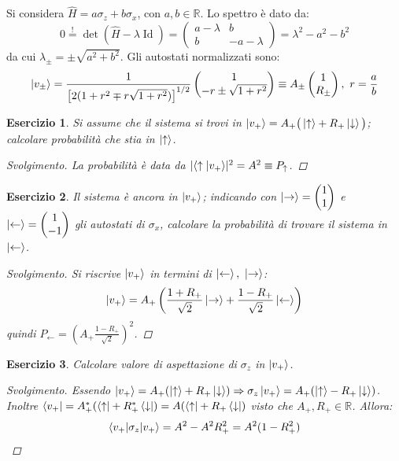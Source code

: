 \documentclass[10pt, a4paper]{scrartcl}
\numberwithin{equation}{subsection}
\theoremstyle{style2}
\theoremstyle{style1}
\newtheorem{esercizio}{Esercizio}[section]
\renewcommand\qedsymbol{$\blacksquare$}
\newenvironment{svolgimento}{\renewcommand\qedsymbol{$\spadesuit$}\begin{proof}[Svolgimento]}{\end{proof}}
\begin{document}
	Si considera $\hat{H} = a \sigma _z + b \sigma _x$, con $a,b \in \mathbb{R}$. Lo spettro \`e dato da:
	\begin{equation*}
		0 \stackrel{!}{=} \det ( \hat{H} - \lambda  \operatorname{Id} ) = \begin{pmatrix} a - \lambda & b \\ b & - a - \lambda  \end{pmatrix} = \lambda ^2 - a^2 - b^2
	\end{equation*}
	da cui $\lambda _{\pm} = \pm \sqrt{a^2 + b^2} $. Gli autostati normalizzati sono:
	\[
	\ket{v_{\pm}}  = \frac{1}{\left[ 2 ( 1+ r^2 \mp r\sqrt{1+r^2} ) \right] ^{ 1/2} } \begin{pmatrix} 1 \\ -r \pm \sqrt{1+ r^2}  \end{pmatrix} \equiv A_{\pm}  \begin{pmatrix} 1 \\ R_{\pm}   \end{pmatrix}, \ r = \frac{a}{b}
	\] 
\begin{esercizio}
	Si assume che il sistema si trovi in $\ket{v_+}  = A_+ \big(\ket{\uparrow} + R_+ \ket{\downarrow} \big)$; calcolare probabilit\`a che stia in $\ket{\uparrow} $.
	\begin{svolgimento}
		La probabilit\`a \`e data da $\lvert \braket{\uparrow|v_+}  \rvert ^2 = A^2 \equiv P_\uparrow$.
	\end{svolgimento}
\end{esercizio}
\begin{esercizio}
Il sistema \`e ancora in $\ket{v_+}$; indicando con $\ket{\rightarrow} = \begin{pmatrix} 1\\ 1 \end{pmatrix} $	e $\ket{\leftarrow} = \begin{pmatrix} 1 \\ -1 \end{pmatrix}  $ gli autostati di $\sigma _x$, calcolare la probabilit\`a di trovare il sistema in $\ket{\leftarrow} $.
\begin{svolgimento}
	Si riscrive $\ket{v_+} $ in termini di $\ket{\leftarrow}, \ \ket{\rightarrow} $:
	\[
	\ket{v_+} = A_+ \left(\frac{1+R_+}{\sqrt{2} }\ket{\rightarrow} + \frac{1-R_+}{\sqrt{2} }\ket{\leftarrow} \right) 
	\] 
quindi $P_\leftarrow = \displaystyle \left(A_+\frac{1-R_+}{\sqrt{2} }\right) ^2$.
\end{svolgimento}
\end{esercizio}
\begin{esercizio}
	Calcolare valore di aspettazione di $\sigma _z$ in $\ket{v_+} $.
	\begin{svolgimento}
		Essendo $\ket{v_+} = A_+(\ket{\uparrow} + R_+ \ket{\downarrow}) \Rightarrow \sigma _z \ket{v_+} = A_+(\ket{\uparrow} - R_+ \ket{\downarrow}) $. Inoltre $\bra{v_+} = A_+^* (\bra{\uparrow} + R_+^* \bra{\downarrow} ) = A(\bra{\uparrow} + R_+ \bra{\downarrow} )$ visto che $A_+, R_+ \in \mathbb{R}$. Allora:
		\[
		\braket{v_+|\sigma _z|v_+} = A^2 - A^2 R_+^2 = A^2 (1-R_+^2)
		\] 
	\end{svolgimento}
\end{esercizio}
\end{document}
